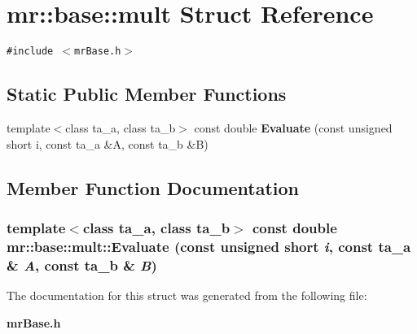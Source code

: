 \section{mr::base::mult Struct Reference}
\label{structmr_1_1base_1_1mult}
{\tt \#include $<$mr\-Base.h$>$}

\subsection*{Static Public Member Functions}
\begin{CompactItemize}
\item 
template$<$class ta\_\-a, class ta\_\-b$>$ const double {\bf Evaluate} (const unsigned short i, const ta\_\-a \&A, const ta\_\-b \&B)
\end{CompactItemize}


\subsection{Member Function Documentation}
\subsubsection{\setlength{\rightskip}{0pt plus 5cm}template$<$class ta\_\-a, class ta\_\-b$>$ const double mr::base::mult::Evaluate (const unsigned short {\em i}, const ta\_\-a \& {\em A}, const ta\_\-b \& {\em B})\hspace{0.3cm}{\tt  [inline, static]}}\label{structmr_1_1base_1_1mult_e0}




The documentation for this struct was generated from the following file:\begin{CompactItemize}
\item 
{\bf mr\-Base.h}\end{CompactItemize}
